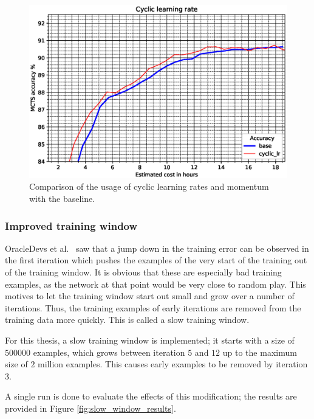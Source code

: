 \documentclass[12pt,onecolumn,oneside,titlepage]{article}
\begin{document}
\begin{figure}[H]
\centering
\includegraphics[clip,width=\columnwidth]{cyclic_results}
\caption{Comparison of the usage of cyclic learning rates and momentum with the baseline.}
\label{fig:cyclic_results}
\end{figure}



\subsubsection{Improved training window}

OracleDevs et al.\ \cite{oracledevs6} saw that a jump down in the training error can be observed in the first iteration which pushes the examples of the very start of the training out of the training window. It is obvious
that these are especially bad training examples, as the network at that point would be very close to random play. 
This motives to let the training window start out small and grow over a number of iterations. Thus, the 
training examples of early iterations are removed from the training data more quickly. This is called a slow training window.

For this thesis, a slow training window is implemented; it starts with a size of $500000$ examples, which grows between 
iteration $5$ and $12$ up to the maximum size of $2$ million examples. This causes early examples to be removed by iteration $3$.

A single run is done to evaluate the effects of this modification; the results are provided in Figure \ref{fig:slow_window_results}. 
\end{document}
